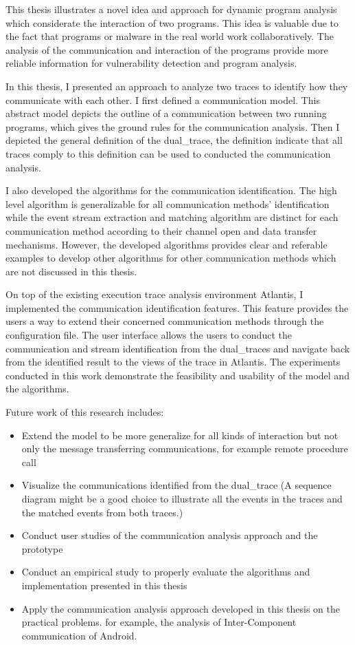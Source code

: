 \label{concl}
This thesis illustrates a novel idea and approach for dynamic program analysis which considerate the interaction of two programs. This idea is valuable due to the fact that programs or malware in the real world work collaboratively. The analysis of the communication and interaction of the programs provide more reliable information for vulnerability detection and program analysis.

In this thesis, I presented an approach to analyze two traces to identify how they communicate with each other. I first defined a communication model. This abstract model depicts the outline of a communication between two running programs, which gives the ground rules for the communication analysis. Then I depicted the general definition of the dual\_trace, the definition indicate that all traces comply to this definition can be used to conducted the communication analysis.

I also developed the algorithms for the communication identification. The high level algorithm is generalizable for all communication methods' identification while  the event stream extraction and matching algorithm are distinct for each communication method according to their channel open and data transfer mechanisms. However, the developed algorithms provides clear and referable examples to develop other algorithms for other communication methods which are not discussed in this thesis.

On top of the existing execution trace analysis environment Atlantis, I implemented the communication identification features. This feature provides the users a way to extend their concerned communication methods through the configuration file. The user interface allows the users to conduct the communication and stream identification from the dual\_traces and navigate back from the identified result to the views of the trace in Atlantis. The experiments conducted in this work demonstrate the feasibility and usability of the model and the algorithms. 


Future work of this research includes:
\begin{itemize}
\item Extend the model to be more generalize for all kinds of interaction but not only the message transferring communications, for example remote procedure call
\item Visualize the communications identified from the dual\_trace (A sequence diagram might be a good choice to illustrate all the events in the traces and the matched events from both traces.) 
\item Conduct user studies of the communication analysis approach and the prototype
\item Conduct an empirical study to properly evaluate the algorithms and implementation presented in this thesis
\item Apply the communication analysis approach developed in this thesis on the practical problems. for example, the analysis of Inter-Component communication of Android. 
\end{itemize}


